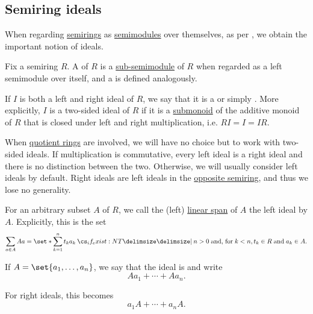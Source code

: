 \subsection{Semiring ideals}\label{subsec:semiring_ideals}

When regarding \hyperref[def:semiring]{semirings} as \hyperref[def:semimodule]{semimodules} over themselves, as per , we obtain the important notion of ideals.

\begin{definition}\label{def:semiring_ideal}\mimprovised
  Fix a semiring \( R \). A  of \( R \) is a \hyperref[def:semimodule/submodel]{sub-semimodule} of \( R \) when regarded as a left semimodule over itself, and a  is defined analogously.

  If \( I \) is both a left and right ideal of \( R \), we say that it is a  or simply . More explicitly, \( I \) is a two-sided ideal of \( R \) if it is a \hyperref[def:monoid/submodel]{submonoid} of the additive monoid of \( R \) that is closed under left and right multiplication, i.e. \( RI = I = IR \).

  When \hyperref[def:ring/quotient]{quotient rings} are involved, we will have no choice but to work with two-sided ideals. If multiplication is commutative, every left ideal is a right ideal and there is no distinction between the two. Otherwise, we will usually consider left ideals by default. Right ideals are left ideals in the \hyperref[def:semiring/opposite]{opposite semiring}, and thus we lose no generality.

  \begin{thmenum}
     For an arbitrary subset \( A \) of \( R \), we call the (left) \hyperref[def:semimodule/submodel]{linear span} of \( A \) the left ideal  by \( A \). Explicitly, this is the set
    \begin{equation*}
      \sum_{a \in A} A a = \set*{ \sum_{k=1}^n t_k a_k \given* n > 0 \T{and, for} k < n, t_k \in R \T{and} a_k \in A }.
    \end{equation*}

    If \( A = \set{ a_1, \ldots, a_n } \), we say that the ideal is  and write
    \begin{equation*}
      A a_1 + \cdots + A a_n.
    \end{equation*}

    For right ideals, this becomes
    \begin{equation*}
      a_1 A + \cdots + a_n A.
    \end{equation*}


\end{thmenum}
\end{definition}
